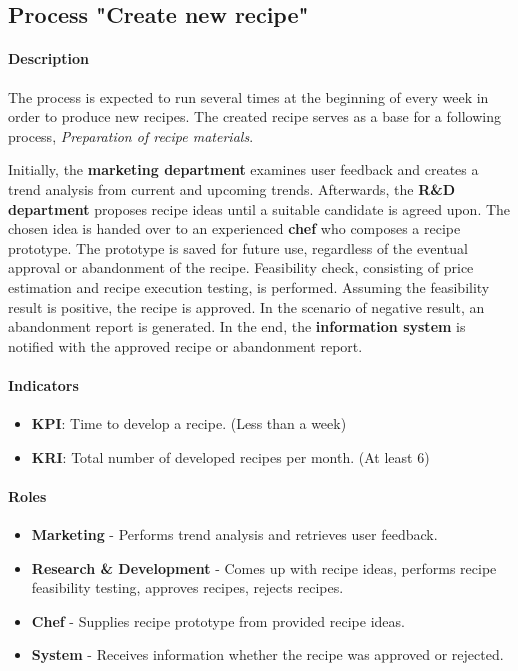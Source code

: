 \documentclass[11pt,a4paper]{article}
\begin{document}



\subsection{Process "Create new recipe"}

\paragraph{Description}
The process is expected to run several times at the beginning of every week in order to produce new recipes. The created recipe serves as a base for a following process, \emph{Preparation of recipe materials}.

\medskip

Initially, the \textbf{marketing department} examines user feedback and creates a trend analysis from current and upcoming trends. Afterwards, the \textbf{R\&D department} proposes recipe ideas until a suitable candidate is agreed upon. The chosen idea is handed over to an experienced \textbf{chef} who composes a recipe prototype. The prototype is saved for future use, regardless of the eventual approval or abandonment of the recipe. Feasibility check, consisting of price estimation and recipe execution testing, is performed. Assuming the feasibility result is positive, the recipe is approved. In the scenario of negative result, an abandonment report is generated. In the end, the \textbf{information system} is notified with the approved recipe or abandonment report.

\paragraph{Indicators}

\begin{itemize}
    \item \textbf{KPI}: Time to develop a recipe. (Less than a week)
    \item \textbf{KRI}: Total number of developed recipes per month. (At least 6)
\end{itemize}

\paragraph{Roles}

\begin{itemize}
    \item \textbf{Marketing} - Performs trend analysis and retrieves user feedback.
    \item \textbf{Research \& Development} - Comes up with recipe ideas, performs recipe feasibility testing, approves recipes, rejects recipes.
    \item \textbf{Chef} - Supplies recipe prototype from provided recipe ideas.
    \item \textbf{System} - Receives information whether the recipe was approved or rejected.
\end{itemize}
\end{document}
